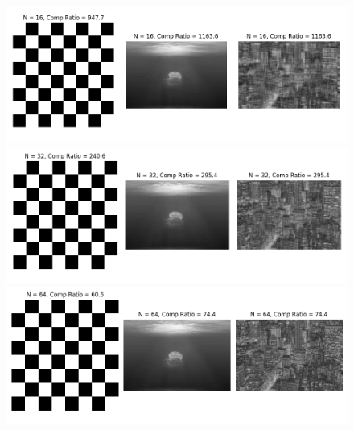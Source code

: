 \documentclass[12p,a4paper]{article}
\begin{document}
\begin{figure}[H]
    \centering
    \includegraphics[width=1.0\linewidth]{../figs/img3.png}
    \includegraphics[width=1.0\linewidth]{../figs/img4.png}
    \includegraphics[width=1.0\linewidth]{../figs/img5.png}
\end{figure}
\end{document}
